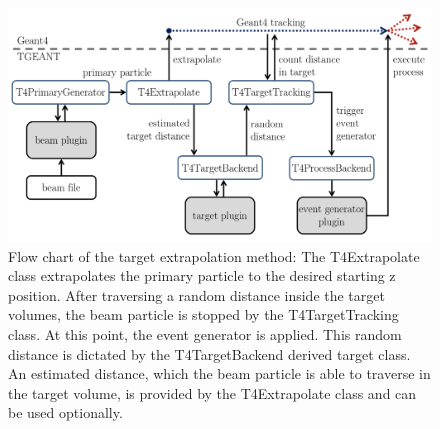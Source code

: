 \begin{figure}[!h]
  \centering
	\includegraphics[scale=0.5]{./gfx/Targetextrap.png}
	\caption{Flow chart of the target extrapolation method: The T4Extrapolate class extrapolates the primary particle to the desired starting z position. After traversing a random distance inside the target volumes, the beam particle is stopped by the T4TargetTracking class. At this point, the event generator is applied. This random distance is dictated by the T4TargetBackend derived target class. An estimated distance, which the beam particle is able to traverse in the target volume, is provided by the T4Extrapolate class and can be used optionally.}
	\label{pic:Targetextrap}
\end{figure}

